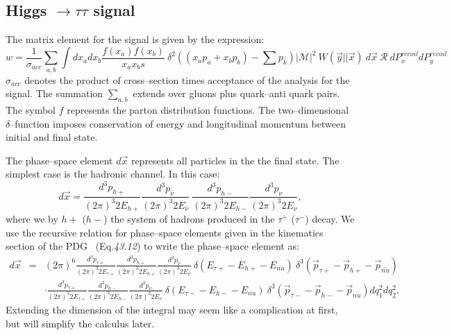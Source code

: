 \subsection{Higgs $\rightarrow \tau\tau$ signal}

The matrix element for the signal is given by the expression:
\begin{equation}
w = \frac{1}{\sigma_{acc}} \sum_{a,b} \int dx_{a} dx_{b} \frac{f(x_{a}) f(x_{b})}{x_{a} x_{b} s} \ \delta^2((x_a p_a + x_b p_b) - \sum p_{k}) 
  \vert \mathcal{M} \vert^2 \ W(\vec{y}|\vert\vec{x}) \ d\vec{x} \ \mathcal{R} \ dP_{x}^{recoil} dP_{y}^{recoil} 
\label{eq:meSignal}
\end{equation}
$\sigma_{acc}$ denotes the product of cross--section times acceptance of the analysis for the signal.
The summation $\sum_{a,b}$ extends over gluons plus quark--anti quark pairs.
The symbol $f$ represents the parton distribution functions.
The two--dimensional $\delta$--function imposes conservation of energy and longitudinal momentum between initial and final state.

The phase--space element $d\vec{x}$ represents all particles in the the final state.
The simplest case is the hadronic channel. In this case:
\begin{equation*}
d\vec{x} = \frac{d^3p_{h+}}{(2\pi)^3 2 E_{h+}} \frac{d^3p_{\bar{\nu}}}{(2\pi)^3 2 E_{\bar{\nu}}} \ \frac{d^3p_{h-}}{(2\pi)^3 2 E_{h-}} \frac{d^3p_{\nu}}{(2\pi)^3 2 E_{\nu}},
\end{equation*}
where we by $h+$ ($h-$) the system of hadrons produced in the $\tau^{+}$ ($\tau^{-}$) decay.
We use the recursive relation for phase--space elements given in the kinematics section of the PDG~\cite{PDG} (Eq.{\it 43.12}) to write the phase--space element as:
\begin{eqnarray*}
d\vec{x} & = & (2\pi)^6 \frac{d^3p_{\tau+}}{(2\pi)^3 2 E_{\tau+}} \frac{d^3p_{h+}}{(2\pi)^3 2 E_{h+}} \frac{d^3p_{\bar{\nu}}}{(2\pi)^3 2 E_{\bar{\nu}}}
  \ \delta(E_{\tau+} - E_{h+} - E_{\bar{nu}}) \ \delta^3(\vec{p}_{\tau+} - \vec{p}_{h+} - \vec{p}_{\bar{nu}}) \\
  & & \cdot \frac{d^3p_{\tau+}}{(2\pi)^3 2 E_{\tau+}} \frac{d^3p_{h-}}{(2\pi)^3 2 E_{h-}} \frac{d^3p_{\nu}}{(2\pi)^3 2 E_{\nu}} 
  \ \delta(E_{\tau-} - E_{h-} - E_{\bar{nu}}) \ \delta^3(\vec{p}_{\tau-} - \vec{p}_{h-} - \vec{p}_{\bar{nu}}) dq_{1}^2 dq_{2}^2.   
\end{eqnarray*}
Extending the dimension of the integral may seem like a complication at first, but will simplify the calculus later.

